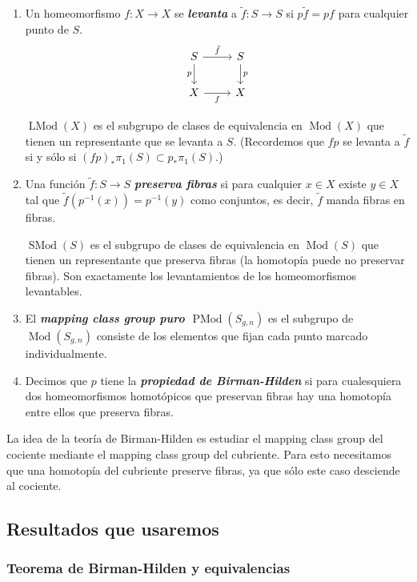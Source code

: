 \documentclass[spanish]{article}
\theoremstyle{definition}
\DeclareMathOperator{\Mod}{Mod}
\DeclareMathOperator{\SMod}{SMod}
\DeclareMathOperator{\LMod}{LMod}
\DeclareMathOperator{\PMod}{PMod}
\begin{document}
\begin{enumerate}
		\item Un homeomorfismo $f:X\to X$ se \textbf{\textit{levanta}} a $\tilde{f}:S\to S$ si $p\tilde{f}= pf$ para cualquier punto de $S$.
		\[\begin{tikzcd}
			S\arrow[r,"\tilde{f}"]\arrow[d,"p",swap]&S\arrow[d,"p"]\\
			X\arrow[swap,r,"f"]&X
		\end{tikzcd}\]
		
		$\LMod(X)$ es el subgrupo de clases de equivalencia en $\Mod(X)$ que tienen un representante que se levanta a $S$. (Recordemos que $fp$ se levanta a $\tilde{f}$ si y sólo si $(fp)_*\pi_1(S)\subset p_*\pi_1(S)$.)
		
		\item Una función $\tilde{f}:S\to S$ \textbf{\textit{preserva fibras}} si para cualquier $x\in X$ existe $y\in X$ tal que $\tilde{f}(p^{-1}(x))=p^{-1}(y)$ como conjuntos, es decir, $\tilde{f}$ manda fibras en fibras.
		
		$\SMod(S)$ es el subgrupo de clases de equivalencia en $\Mod(S)$ que tienen un representante que preserva fibras (la homotopía puede no preservar fibras). Son exactamente los levantamientos de los homeomorfismos levantables.
		
		\item El \textbf{\textit{mapping class group puro $\PMod(S_{g,n})$}} es el subgrupo de $\Mod(S_{g,n})$ consiste de los elementos que fijan cada punto marcado individualmente.
		
		\item Decimos que $p$ tiene la \textbf{\textit{propiedad de Birman-Hilden}} si para cualesquiera dos homeomorfismos homotópicos que preservan fibras hay una homotopía entre ellos que preserva fibras.
		
	\end{enumerate}

La idea de la teoría de Birman-Hilden es estudiar el mapping class group del cociente mediante el mapping class group del cubriente. Para esto necesitamos que una homotopía del cubriente preserve fibras, ya que sólo este caso desciende al cociente.

\subsection{Resultados que usaremos}

\subsubsection{Teorema de Birman-Hilden y equivalencias}
\end{document}
